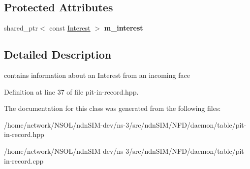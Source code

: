 \subsection*{Protected Attributes}
\begin{DoxyCompactItemize}
\item 
shared\+\_\+ptr$<$ const \hyperlink{classndn_1_1Interest}{Interest} $>$ {\bfseries m\+\_\+interest}\hypertarget{classnfd_1_1pit_1_1InRecord_a55b99f9a041126e6e4989bfc2d26bcdc}{}\label{classnfd_1_1pit_1_1InRecord_a55b99f9a041126e6e4989bfc2d26bcdc}

\end{DoxyCompactItemize}


\subsection{Detailed Description}
contains information about an Interest from an incoming face 

Definition at line 37 of file pit-\/in-\/record.\+hpp.



The documentation for this class was generated from the following files\+:\begin{DoxyCompactItemize}
\item 
/home/network/\+N\+S\+O\+L/ndn\+S\+I\+M-\/dev/ns-\/3/src/ndn\+S\+I\+M/\+N\+F\+D/daemon/table/pit-\/in-\/record.\+hpp\item 
/home/network/\+N\+S\+O\+L/ndn\+S\+I\+M-\/dev/ns-\/3/src/ndn\+S\+I\+M/\+N\+F\+D/daemon/table/pit-\/in-\/record.\+cpp\end{DoxyCompactItemize}
